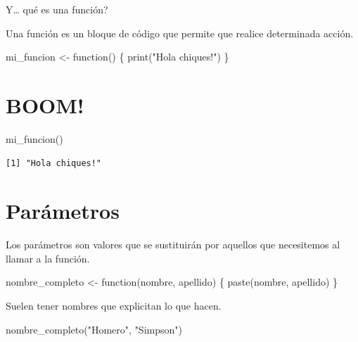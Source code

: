 \documentclass[
  letterpaper,
  DIV=11,
  numbers=noendperiod]{scrreprt}
\newenvironment{Shaded}{\begin{snugshade}}{\end{snugshade}}
\newcommand{\ControlFlowTok}[1]{\textcolor[rgb]{0.00,0.23,0.31}{#1}}
\newcommand{\FunctionTok}[1]{\textcolor[rgb]{0.28,0.35,0.67}{#1}}
\newcommand{\NormalTok}[1]{\textcolor[rgb]{0.00,0.23,0.31}{#1}}
\newcommand{\OtherTok}[1]{\textcolor[rgb]{0.00,0.23,0.31}{#1}}
\newcommand{\StringTok}[1]{\textcolor[rgb]{0.13,0.47,0.30}{#1}}
\begin{document}
Y\ldots{} qué es una función?

Una función es un bloque de código que permite que realice determinada
acción.

\begin{Shaded}
\begin{Highlighting}[]
\NormalTok{mi\_funcion }\OtherTok{\textless{}{-}} \ControlFlowTok{function}\NormalTok{() \{ }
  \FunctionTok{print}\NormalTok{(}\StringTok{"Hola chiques!"}\NormalTok{)}
\NormalTok{\}}
\end{Highlighting}
\end{Shaded}

\hypertarget{boom}{%
\section{BOOM!}\label{boom}}

\begin{Shaded}
\begin{Highlighting}[]
\FunctionTok{mi\_funcion}\NormalTok{()}
\end{Highlighting}
\end{Shaded}

\begin{verbatim}
[1] "Hola chiques!"
\end{verbatim}

\hypertarget{paruxe1metros}{%
\section{Parámetros}\label{paruxe1metros}}

Los parámetros son valores que se sustituirán por aquellos que
necesitemos al llamar a la función.

\begin{Shaded}
\begin{Highlighting}[]
\NormalTok{nombre\_completo }\OtherTok{\textless{}{-}} \ControlFlowTok{function}\NormalTok{(nombre, apellido) \{}
  \FunctionTok{paste}\NormalTok{(nombre, apellido)}
\NormalTok{\}}
\end{Highlighting}
\end{Shaded}

Suelen tener nombres que explicitan lo que hacen.

\begin{Shaded}
\begin{Highlighting}[]
\FunctionTok{nombre\_completo}\NormalTok{(}\StringTok{"Homero"}\NormalTok{, }\StringTok{"Simpson"}\NormalTok{)}
\end{Highlighting}
\end{Shaded}
\end{document}
